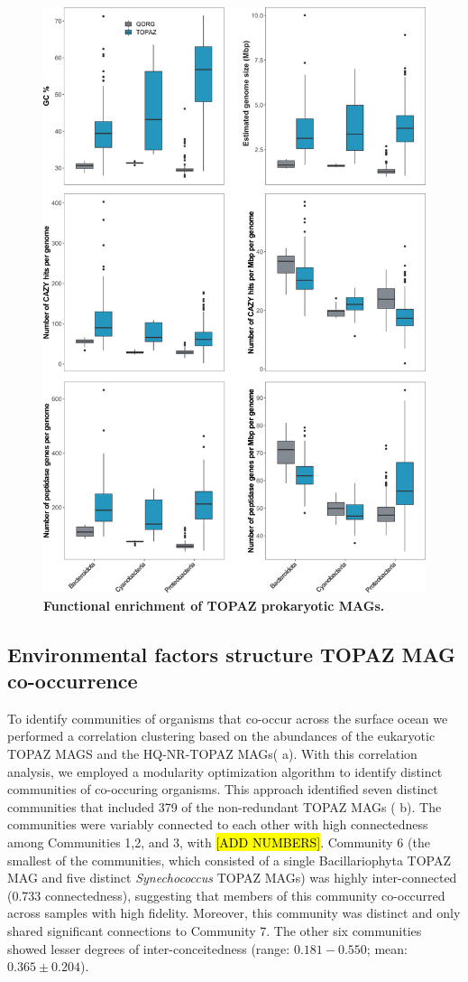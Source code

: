 \documentclass[12pt]{article}
\numberwithin{equation}{section}
\begin{document}
\begin{figure}[h!]    
    \centering
    \includegraphics[width = 0.75\columnwidth]{figures/Figure2-TOPAZ_prok_features_vsGORG_mod.png}
    \caption{\textbf{Functional enrichment of TOPAZ prokaryotic MAGs.} }
    \label{fig:fig6-prokfunc}
\end{figure}



\subsection*{Environmental factors structure TOPAZ MAG co-occurrence }
To identify communities of organisms that co-occur across the surface ocean we performed a correlation clustering based on the abundances of the eukaryotic TOPAZ MAGS and the HQ-NR-TOPAZ MAGs( a). With this correlation analysis, we employed a modularity optimization algorithm \cite{blondel2008fast} to identify distinct communities of co-occuring organisms. This approach identified seven distinct communities that included 379 of the non-redundant TOPAZ MAGs ( b). The communities were variably connected to each other with  high connectedness  among Communities 1,2, and 3, with \hl{[ADD NUMBERS]}.  Community 6 (the smallest of the communities, which consisted of a single Bacillariophyta TOPAZ MAG and five distinct \textit{Synechococcus} TOPAZ MAGs) was highly inter-connected (0.733 connectedness), suggesting that members of this community co-occurred across samples with high fidelity. Moreover, this community was distinct and only shared significant connections to Community 7. The other six communities showed lesser degrees of inter-conceitedness (range: $0.181-0.550$; mean: $0.365\pm0.204$).
\end{document}
